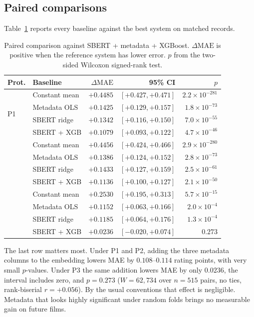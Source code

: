 \documentclass[conference,a4paper]{IEEEtran}
\begin{document}
\subsection{Paired comparisons}

Table~\ref{tab:paired} reports every baseline against the best system on
matched records.

\begin{table}[t]
\caption{Paired comparison against SBERT + metadata + XGBoost.
$\Delta\mathrm{MAE}$ is positive when the reference system has lower
error. $p$ from the two-sided Wilcoxon signed-rank test.}
\label{tab:paired}
\centering
\small
\setlength{\tabcolsep}{3pt}
\begin{tabular}{llrrr}
\toprule
\textbf{Prot.} & \textbf{Baseline} & $\Delta\mathrm{MAE}$ & \textbf{95\% CI} & $p$ \\
\midrule
\multirow{4}{*}{P1}
 & Constant mean   & $+0.4485$ & $[+0.427, +0.471]$ & $2.2\!\times\!10^{-281}$ \\
 & Metadata OLS    & $+0.1425$ & $[+0.129, +0.157]$ & $1.8\!\times\!10^{-73}$ \\
 & SBERT ridge     & $+0.1342$ & $[+0.116, +0.150]$ & $7.0\!\times\!10^{-55}$ \\
 & SBERT + XGB     & $+0.1079$ & $[+0.093, +0.122]$ & $4.7\!\times\!10^{-46}$ \\
\addlinespace[2pt]
\multirow{4}{*}{P2}
 & Constant mean   & $+0.4456$ & $[+0.424, +0.466]$ & $2.9\!\times\!10^{-280}$ \\
 & Metadata OLS    & $+0.1386$ & $[+0.124, +0.152]$ & $2.8\!\times\!10^{-73}$ \\
 & SBERT ridge     & $+0.1433$ & $[+0.127, +0.159]$ & $2.5\!\times\!10^{-61}$ \\
 & SBERT + XGB     & $+0.1136$ & $[+0.100, +0.127]$ & $2.1\!\times\!10^{-50}$ \\
\addlinespace[2pt]
\multirow{4}{*}{P3}
 & Constant mean   & $+0.2530$ & $[+0.195, +0.313]$ & $5.7\!\times\!10^{-15}$ \\
 & Metadata OLS    & $+0.1152$ & $[+0.063, +0.166]$ & $2.0\!\times\!10^{-4}$ \\
 & SBERT ridge     & $+0.1185$ & $[+0.064, +0.176]$ & $1.3\!\times\!10^{-4}$ \\
 & SBERT + XGB     & $+0.0236$ & $[-0.020, +0.074]$ & $0.273$ \\
\bottomrule
\end{tabular}
\end{table}

The last row matters most. Under P1 and P2, adding the three metadata
columns to the embedding lowers MAE by $0.108$--$0.114$ rating points,
with very small $p$-values. Under P3 the same addition lowers MAE by only
$0.0236$, the interval includes zero, and $p = 0.273$ ($W = 62{,}734$
over $n = 515$ pairs, no ties, rank-biserial $r = +0.056$). By the usual
conventions that effect is negligible. Metadata that looks highly
significant under random folds brings no measurable gain on future
films.
\end{document}
